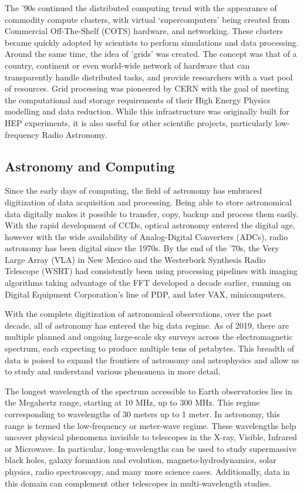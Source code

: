 The '90s continued the distributed computing trend with the appearance of commodity compute clusters, with virtual `supercomputers' being created from Commercial Off-The-Shelf (COTS) hardware, and networking. These clusters became quickly adopted by scientists to perform simulations and data processing. Around the same time, the idea of 'grids' was created. The concept was that of a country, continent or even world-wide network of hardware that can transparently handle distributed tasks, and provide researchers with a vast pool of resources. Grid processing was pioneered by CERN with the goal of meeting the computational and storage requirements of their High Energy Physics modelling and data reduction. While this infrastructure was originally built for HEP experiments, it is also useful for other scientific projects, particularly low-frequency Radio Astronomy. 


\subsection{Astronomy and Computing}

Since the early days of computing, the field of astronomy has embraced digitization of data acquisition and processing. Being able to store astronomical data digitally makes it possible to transfer, copy, backup and process them easily. With the rapid development of CCDs, optical astronomy entered the digital age, however with the wide availability of Analog-Digital Converters (ADCs), radio astronomy has been digital since the 1970s. By the end of the '70s, the Very Large Array (VLA) in New Mexico and the Westerbork Synthesis Radio Telescope (WSRT) had consistently been using processing pipelines with imaging algorithms taking advantage of the FFT developed a decade earlier\citep{clark1980_clean}, running on Digital Equipment Corporation's line of PDP, and later VAX, minicomputers. 

With the complete digitization of astronomical observations, over the past decade,  all of astronomy has entered the big data regime. As of 2019, there are multiple planned and ongoing large-scale sky surveys across the electromagnetic spectrum, each expecting to produce multiple tens of petabytes. This breadth of data is poised to expand the frontiers of astronomy and astrophysics and allow us to study and understand various phenomena in more detail.

The longest wavelength of the spectrum accessible to Earth observatories lies in the Megahertz range, starting at 10 MHz, up to 300 MHz. This regime corresponding to wavelengths of 30 meters up to 1 meter. In astronomy, this range is termed the low-frequency or meter-wave regime. These wavelengths help uncover physical phenomena invisible to telescopes in the X-ray, Visible, Infrared or Microwave. In particular, long-wavelengths can be used to study supermassive black holes, galaxy formation and evolution, magneto-hydrodynamics, solar physics, radio spectroscopy, and many more science cases. Additionally, data in this domain can complement other telescopes in multi-wavelength studies.

